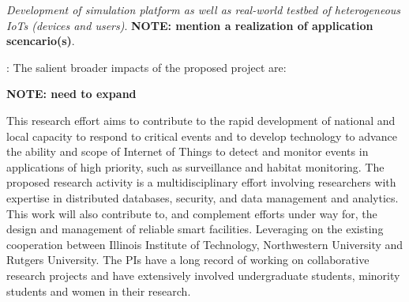 {\it Development of simulation platform as well as real-world testbed of heterogeneous IoTs (devices and users)}. {\bf NOTE: mention a realization of application scencario(s)}.


: The salient broader impacts of the proposed project are:

{\bf NOTE: need to expand}

This research effort aims to contribute to the rapid development of national and local capacity to respond to critical events and to develop technology to advance the ability and scope of Internet of Things to detect and monitor events in applications of high priority, such as surveillance and habitat monitoring. The proposed research activity is a multidisciplinary effort involving researchers with expertise in distributed databases, security, and data management and analytics. This work will also contribute to, and complement efforts under way for, the design and management of reliable smart facilities. Leveraging on the existing cooperation between Illinois Institute of Technology, Northwestern University and Rutgers University. The PIs have a long record of working on collaborative research projects and have extensively involved undergraduate students, minority students and women in their research.




